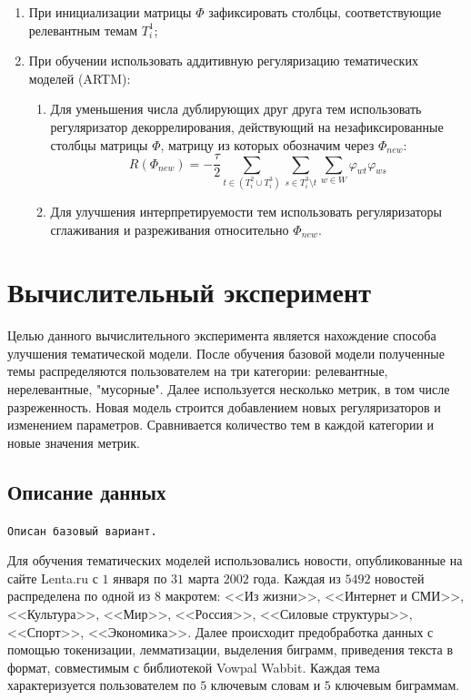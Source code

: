 \documentclass{article}
\begin{document}
\begin{enumerate}
    \item При инициализации матрицы $\Phi$ зафиксировать столбцы, соответствующие релевантным темам $T_i^1$;
    \item При обучении использовать аддитивную регуляризацию тематических моделей (ARTM):
    \begin{enumerate}
        \item Для уменьшения числа дублирующих друг друга тем использовать регуляризатор декоррелирования, действующий на незафиксированные столбцы матрицы $\Phi$, матрицу из которых обозначим через $\Phi_{new}$:
        $$R (\Phi_{new}) = -\frac{\tau}{2} \sum \limits_{t \in (T_i^2 \cup T_i^3)} \sum \limits_{s \in T_i^3 \setminus t} \sum \limits_{w \in W} \varphi_{wt} \varphi_{ws}$$
        \item Для улучшения интерпретируемости тем использовать регуляризаторы сглаживания и разреживания относительно $\Phi_{new}$.
    \end{enumerate}
\end{enumerate}


\section{Вычислительный эксперимент}

Целью данного вычислительного эксперимента является нахождение способа улучшения тематической модели.
После обучения базовой модели полученные темы распределяются пользователем на три категории: релевантные, нерелевантные, "мусорные".
Далее используется несколько метрик, в том числе разреженность.
Новая модель строится добавлением новых регуляризаторов и изменением параметров.
Сравнивается количество тем в каждой категории и новые значения метрик.

\subsection{Описание данных}

\texttt{Описан базовый вариант.}

Для обучения тематических моделей использовались новости, опубликованные на сайте Lenta.ru с $1$ января по $31$ марта $2002$ года.
Каждая из $5492$ новостей распределена по одной из $8$ макротем: <<Из жизни>>, <<Интернет и СМИ>>, <<Культура>>, <<Мир>>, <<Россия>>, <<Силовые структуры>>, <<Спорт>>, <<Экономика>>.
Далее происходит предобработка данных с помощью токенизации, лемматизации, выделения биграмм, приведения текста в формат, совместимым с библиотекой Vowpal Wabbit.
Каждая тема характеризуется пользователем по $5$ ключевым словам и $5$ ключевым биграммам.
\end{document}
